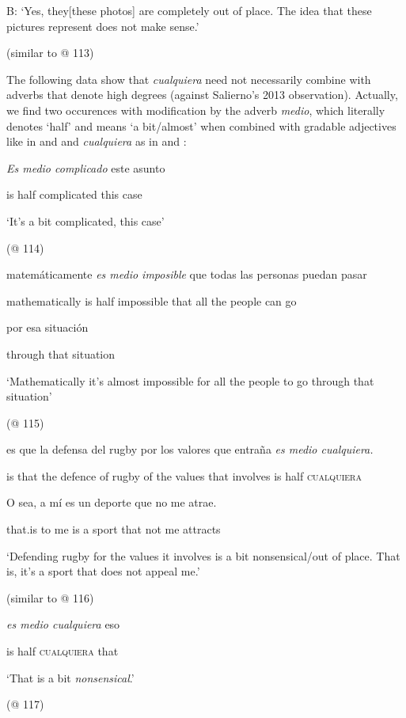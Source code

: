 \documentclass[output=paper]{langscibook}
\begin{document}
B: ‘Yes, they[these photos] are completely out of place. The idea that these pictures represent does not make sense.’

  (similar to @ 113)

The following data show that \textit{cualquiera} need not necessarily combine with adverbs that denote high degrees (against Salierno’s 2013 observation). Actually, we find two occurences with modification by the adverb \textit{medio}, which literally denotes ‘half’ and means ‘a bit/almost’ when combined with gradable adjectives like in  and  and \textit{cualquiera} as in  and :

\label{bkm:Ref150786427}    \textit{Es  medio  complicado} este  asunto

    is  half  complicated  this  case

    ‘It’s a bit complicated, this case’

    (@ 114)

\label{bkm:Ref150786436}    matemáticamente  \textit{es  medio  imposible} que  todas  las  personas  puedan  pasar

    mathematically  is  half  impossible  that  all  the  people  can  go

    por  esa  situación

    through  that  situation

    ‘Mathematically it’s almost impossible for all the people to go through that situation’

    (@ 115)

\label{bkm:Ref150786444}    es  que  la  defensa  del  rugby  por  los  valores  que  entraña  \textit{es  medio  cualquiera.}

    is  that  the  defence  of  rugby  of  the  values  that  involves  is  half  \textsc{cualquiera}

    O sea,  a  mí  es  un  deporte  que  no  me  atrae.      

    that.is  to  me  is  a  sport  that  not  me  attracts      

    ‘Defending rugby for the values it involves is a bit nonsensical/out of place. That is, it’s a sport that does not appeal me.’

    (similar to @ 116)

\label{bkm:Ref150786457}    \textit{es  medio  cualquiera} eso

    is  half  \textsc{cualquiera}  that

    ‘That is a bit \textit{nonsensical}.’

    (@ 117)
\end{document}
